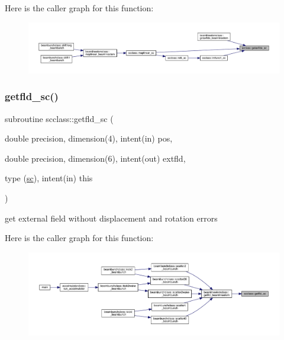 Here is the caller graph for this function\+:\nopagebreak
\begin{figure}[H]
\begin{center}
\leavevmode
\includegraphics[width=350pt]{namespacescclass_aefc9ea62cf36830e2c74869fff2f1b17_icgraph}
\end{center}
\end{figure}
\mbox{\label{namespacescclass_a5af81e94b531e8d02789525f1f4438ac}} 
\subsubsection{\texorpdfstring{getfld\_sc()}{getfld\_sc()}}
{\footnotesize\ttfamily subroutine scclass\+::getfld\+\_\+sc (\begin{DoxyParamCaption}\item[{double precision, dimension(4), intent(in)}]{pos,  }\item[{double precision, dimension(6), intent(out)}]{extfld,  }\item[{type (\mbox{\hyperlink{namespacescclass_structscclass_1_1sc}{sc}}), intent(in)}]{this }\end{DoxyParamCaption})}



get external field without displacement and rotation errors 

Here is the caller graph for this function\+:\nopagebreak
\begin{figure}[H]
\begin{center}
\leavevmode
\includegraphics[width=350pt]{namespacescclass_a5af81e94b531e8d02789525f1f4438ac_icgraph}
\end{center}
\end{figure}
\mbox{\label{namespacescclass_abe42c84df8190cc0443752dff296dd89}} 
